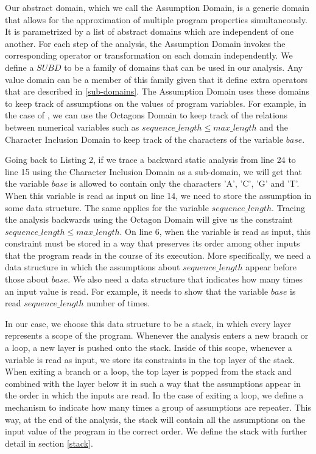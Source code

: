 \documentclass[10pt]{report}
\begin{document}
Our abstract domain, which we call the Assumption Domain, is a generic domain that allows for the approximation of multiple program properties simultaneously. It is parametrized by a list of abstract domains which are independent of one another. For each step of the analysis, the Assumption Domain invokes the corresponding operator or transformation on each domain independently. We define a $ SUBD $ to be a family of domains that can be used in our analysis. Any value domain can be a member of this family given that it define extra operators that are described in \ref{sub-domains}. The Assumption Domain uses these domains to keep track of assumptions on the values of program variables. For example, in the case of , we can use the Octagons Domain \cite{octagon} to keep track of the relations between numerical variables such as $sequence\_length \leq max\_length$ and the Character Inclusion Domain \cite{character} to keep track of the characters of the variable $base$.

Going back to Listing 2, if we trace a backward static analysis from line 24 to line 15 using the Character Inclusion Domain as a sub-domain, we will get that the variable $ base $ is allowed to contain only the characters 'A', 'C', 'G' and 'T'. When this variable is read as input on line 14, we need to store the assumption in some data structure. The same applies for the variable $ sequence\_length $. Tracing the analysis backwards using the Octagon Domain will give us the constraint $ sequence\_length \leq max\_length $. On line 6, when the variable is read as input, this constraint must be stored in a way that preserves its order among other inputs that the program reads in the course of its execution. More specifically, we need a data structure in which the assumptions about $ sequence\_length$ appear before those about $ base $.  We also need a data structure that indicates how many times an input value is read. For example, it needs to show that the variable $ base $ is read $ sequence\_length $ number of times. 

In our case, we choose this data structure to be a stack, in which every layer represents a scope of the program. Whenever the analysis enters a new branch or a loop, a new layer is pushed onto the stack. Inside of this scope, whenever a variable is read as input, we store its constraints in the top layer of the stack. When exiting a branch or a loop, the top layer is popped from the stack and combined with the layer below it in such a way that the assumptions appear in the order in which the inputs are read. In the case of exiting a loop, we define a mechanism to indicate how many times a group of assumptions are repeater. This way, at the end of the analysis, the stack will contain all the assumptions on the input value of the program in the correct order. We define the stack with further detail in section \ref{stack}. 
\end{document}
